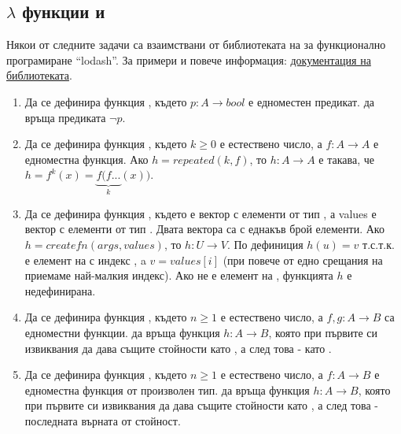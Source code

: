 \subsection{$\lambda$ функции и }

\begin{mdframed}[hidealllines=true,backgroundcolor=gray!20]
  Някои от следните задачи са взаимствани от библиотеката на  за функционално програмиране ``lodash''. За примери и повече информация: \href{https://lodash.com/docs/4.17.15#after}{документация на библиотеката}.
\end{mdframed}

\begin{enumerate}[resume]

  \item Да се дефинира функция , където $p:A \rightarrow bool$ е едноместен предикат.  да връща предиката $\neg p$.


  \item Да се дефинира функция , където $k \geq 0$ е естествено число, а $f:A \rightarrow A$ е едноместна функция. Ако $h=repeated(k,f)$, то $h:A \rightarrow A$ е такава, че $h=f^k(x)=\underbrace{f(f...}_{k}(x))$.

  \item Да се дефинира функция , където  е вектор с елементи от тип , а values е вектор с елементи от тип . Двата вектора са с еднакъв брой елементи. Ако $h=createfn(args,values)$, то $h:U \rightarrow V$. По дефиниция $h(u)=v$ т.с.т.к.  е елемент на  с индекс , a $v=values[i]$ (при повече от едно срещания на  приемаме най-малкия индекс). Ако  не е елемент на , функцията $h$ е недефинирана.

  \item Да се дефинира функция , където $n \geq 1$ е естествено число, а $f,g:A \rightarrow B$ са едноместни функции.  да връща функция $h:A \rightarrow B$, която при първите си  извиквания да дава същите стойности като , а след това - като .


  \item Да се дефинира функция , където $n \geq 1$ е естествено число, а $f:A \rightarrow B$ е едноместна функция от произволен тип.  да връща функция $h:A \rightarrow B$, която при първите си  извиквания да дава същите стойности като , а след това - последната върната от  стойност.
  
\end{enumerate}


